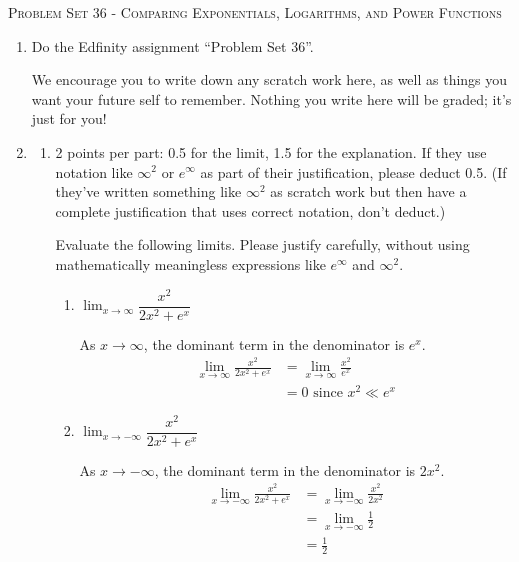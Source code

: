 \documentclass{article}
\newcommand{\doedfinity}[2][\newpage]{
  \begin{problem}[#1]
    Do the Edfinity assignment ``Problem Set #2''.

    We encourage you to write down any scratch work here, as well as
    things you want your future self to remember. Nothing you write
    here will be graded; it's just for you!
  \end{problem}
}
\begin{document}
\begin{center}
  \large\textsc{Problem Set 36 - Comparing Exponentials, Logarithms, and Power Functions}
\end{center}

\begin{enumerate}
\item \doedfinity{36}

\item  

  \begin{enumerate}
  \item \label{growth-rate-limits-1}

    \begin{grading}
      2 points per part: 0.5 for the limit, 1.5 for the explanation. If they use notation like $\infty^2$ or $e^\infty$ as part of their justification, please deduct 0.5. (If they've written something like $\infty^2$ as scratch work but then have a complete justification that uses correct notation, don't deduct.)
    \end{grading}

    Evaluate the following limits. Please justify carefully, without using mathematically meaningless expressions like $e^\infty$ and $\infty^2$.

    \begin{enumerate}
    \item
      \begin{problem}[\vfill]
        $\displaystyle \lim_{x \to \infty} \dfrac{x^2}{2x^2 + e^x}$
      \end{problem}

      \begin{solution}
      As $x \to \infty$, the dominant term in the denominator is
      $e^x$.
        \begin{align*}
          \lim_{x \to \infty} \frac{x^2}{2x^2 + e^x} &= 
          \lim_{x \to \infty} \frac{x^2}{e^x} \\
          &= 0 \text{ since $x^2 \ll e^x$}
        \end{align*}
      \end{solution}

    \item
      \begin{problem}[\vfill]
        $\displaystyle \lim_{x \to -\infty} \dfrac{x^2}{2x^2 + e^x}$
      \end{problem}

      \begin{solution}
      As $x\to -\infty$, the dominant term in the denominator
      is $2x^2$. 
        \begin{align*}
          \lim_{x \to -\infty} \frac{x^2}{2x^2 + e^x} &= 
          \lim_{x \to -\infty} \frac{x^2}{2x^2} \\
          &= \lim_{x \to -\infty} \frac{1}{2} \\
          &= \frac{1}{2}
        \end{align*}
      \end{solution}


\end{enumerate}
\end{enumerate}
\end{enumerate}
\end{document}
